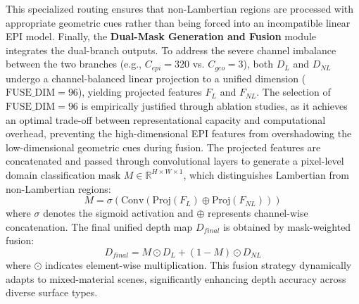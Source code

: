 This specialized routing ensures that non-Lambertian regions are processed with appropriate geometric cues rather than being forced into an incompatible linear EPI model. Finally, the \textbf{Dual-Mask Generation and Fusion} module integrates the dual-branch outputs. To address the severe channel imbalance between the two branches (e.g., $C_{epi}=320$ vs. $C_{geo}=3$), both $D_L$ and $D_{NL}$ undergo a channel-balanced linear projection to a unified dimension ($\text{FUSE\_DIM}=96$), yielding projected features $F_L$ and $F_{NL}$. The selection of $\text{FUSE\_DIM}=96$ is empirically justified through ablation studies, as it achieves an optimal trade-off between representational capacity and computational overhead, preventing the high-dimensional EPI features from overshadowing the low-dimensional geometric cues during fusion. The projected features are concatenated and passed through convolutional layers to generate a pixel-level domain classification mask $M \in \mathbb{R}^{H \times W \times 1}$, which distinguishes Lambertian from non-Lambertian regions:
\begin{equation}
\label{eq:eq4}
M = \sigma(\text{Conv}(\text{Proj}(F_L) \oplus \text{Proj}(F_{NL})))
\end{equation}
where $\sigma$ denotes the sigmoid activation and $\oplus$ represents channel-wise concatenation. The final unified depth map $D_{final}$ is obtained by mask-weighted fusion:
\begin{equation}
\label{eq:eq5}
D_{final} = M \odot D_L + (1-M) \odot D_{NL}
\end{equation}
where $\odot$ indicates element-wise multiplication. This fusion strategy dynamically adapts to mixed-material scenes, significantly enhancing depth accuracy across diverse surface types.

